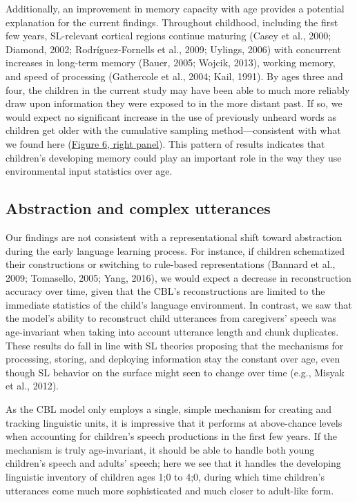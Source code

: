 \documentclass[man,mask,floatsintext]{apa6}
\theoremstyle{definition}
\theoremstyle{definition}
\theoremstyle{definition}
\theoremstyle{remark}
\begin{document}
Additionally, an improvement in memory capacity with age provides a
potential explanation for the current findings. Throughout childhood,
including the first few years, SL-relevant cortical regions continue
maturing (Casey et al., 2000; Diamond, 2002; Rodríguez-Fornells et al.,
2009; Uylings, 2006) with concurrent increases in long-term memory
(Bauer, 2005; Wojcik, 2013), working memory, and speed of processing
(Gathercole et al., 2004; Kail, 1991). By ages three and four, the
children in the current study may have been able to much more reliably
draw upon information they were exposed to in the more distant past. If
so, we would expect no significant increase in the use of previously
unheard words as children get older with the cumulative sampling
method---consistent with what we found here
(\protect\hyperlink{fig6}{Figure 6, right panel}). This pattern of
results indicates that children's developing memory could play an
important role in the way they use environmental input statistics over
age.

\subsection{Abstraction and complex
utterances}\label{abstraction-and-complex-utterances}

Our findings are not consistent with a representational shift toward
abstraction during the early language learning process. For instance, if
children schematized their constructions or switching to rule-based
representations (Bannard et al., 2009; Tomasello, 2005; Yang, 2016), we
would expect a decrease in reconstruction accuracy over time, given that
the CBL's reconstructions are limited to the immediate statistics of the
child's language environment. In contrast, we saw that the model's
ability to reconstruct child utterances from caregivers' speech was
age-invariant when taking into account utterance length and chunk
duplicates. These results do fall in line with SL theories proposing
that the mechanisms for processing, storing, and deploying information
stay the constant over age, even though SL behavior on the surface might
seen to change over time (e.g., Misyak et al., 2012).

As the CBL model only employs a single, simple mechanism for creating
and tracking linguistic units, it is impressive that it performs at
above-chance levels when accounting for children's speech productions in
the first few years. If the mechanism is truly age-invariant, it should
be able to handle both young children's speech and adults' speech; here
we see that it handles the developing linguistic inventory of children
ages 1;0 to 4;0, during which time children's utterances come much more
sophisticated and much closer to adult-like form.
\end{document}

